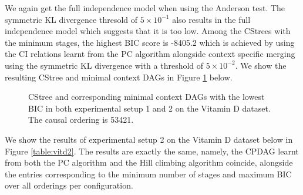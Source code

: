 \documentclass{tufte-book}
\begin{document}
We again get the full independence model when using the Anderson test. The symmetric KL divergence thresold of \(5\times 10^{-1}\) also results in the full independence model which suggests that it is too low. Among the CStrees with the minimum stages, the highest BIC score is -8405.2 which is achieved by using the CI relations learnt from the PC algorithm alongside context specific merging using the symmetric KL divergence with a threshold of \(5 \times 10^{-2}\). We show the resulting CStree and minimal context DAGs in Figure \ref{fig:vitdmaxbic} below.

\begin{figure}[!h]\label{fig:vitdmaxbic}
   \begin{floatrow}
%
\caption{CStree and corresponding minimal context DAGs with the lowest BIC in both experimental setup 1 and 2 on the Vitamin D dataset. The causal ordering is 53421. }
        
   \end{floatrow}
\end{figure}

We show the results of experimental setup 2 on the Vitamin D dataset below in Figure \ref{table:vitd2}. The results are exactly the same, namely, the CPDAG learnt from both the PC algorithm and the Hill climbing algorithm coincide, alongside the entries corresponding to the minimum number of stages and maximum BIC over all orderings per configuration.
\end{document}
